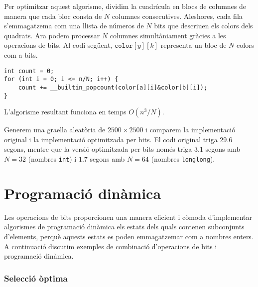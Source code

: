 Per optimitzar aquest algorisme, dividim la cuadrícula en blocs de
columnes de manera que cada bloc consta de $N$ columnes
consecutives. Aleshores, cada fila s'emmagatzema com una llista de
números de $N$ bits que descriuen els colors dels quadrats. Ara podem
processar $N$ columnes simultàniament gràcies a les operacions de
bits. Al codi següent, $\texttt{color}[y][k]$ representa un bloc de
$N$ colors com a bits.
\begin{lstlisting}
int count = 0;
for (int i = 0; i <= n/N; i++) {
    count += __builtin_popcount(color[a][i]&color[b][i]);
}
\end{lstlisting}
L'algorisme resultant funciona en temps $O(n^3/N)$.

Generem una graella aleatòria de $2500 \times 2500$ i comparem la
implementació original i la implementació optimitzada per bits. El
codi original triga $29.6$ segons, mentre que la versió optimitzada
per bits només triga $3.1$ segons amb $N=32$ (nombres
\texttt{int}) i $1.7$ segons amb $N=64$ (nombres \texttt{longlong}).

\section{Programació dinàmica}

Les operacions de bits proporcionen una manera eficient i còmoda
d'implementar algorismes de programació dinàmica els estats dels quals
contenen subconjunts d'elements, perquè aquests estats es poden
emmagatzemar com a nombres enters. A continuació discutim exemples de
combinació d'operacions de bits i programació dinàmica.

\subsubsection{Selecció òptima}

